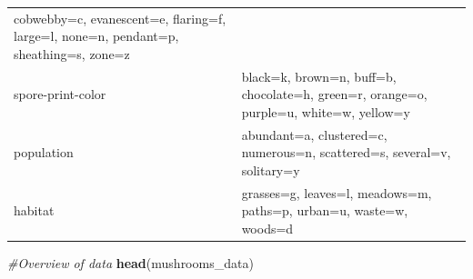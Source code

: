 \documentclass[
]{article}
\newenvironment{Shaded}{\begin{snugshade}}{\end{snugshade}}
\newcommand{\CommentTok}[1]{\textcolor[rgb]{0.56,0.35,0.01}{\textit{#1}}}
\newcommand{\KeywordTok}[1]{\textcolor[rgb]{0.13,0.29,0.53}{\textbf{#1}}}
\newcommand{\NormalTok}[1]{#1}
\begin{document}
\begin{longtable}[]{@{}ll@{}}
\begin{minipage}[t]{0.47\columnwidth}
cobwebby=c, evanescent=e, flaring=f, large=l, none=n, pendant=p,
sheathing=s, zone=z\strut
\end{minipage}\tabularnewline
\begin{minipage}[t]{0.47\columnwidth}\raggedright
spore-print-color\strut
\end{minipage} & \begin{minipage}[t]{0.47\columnwidth}\raggedright
black=k, brown=n, buff=b, chocolate=h, green=r, orange=o, purple=u,
white=w, yellow=y\strut
\end{minipage}\tabularnewline
\begin{minipage}[t]{0.47\columnwidth}\raggedright
population\strut
\end{minipage} & \begin{minipage}[t]{0.47\columnwidth}\raggedright
abundant=a, clustered=c, numerous=n, scattered=s, several=v,
solitary=y\strut
\end{minipage}\tabularnewline
\begin{minipage}[t]{0.47\columnwidth}\raggedright
habitat\strut
\end{minipage} & \begin{minipage}[t]{0.47\columnwidth}\raggedright
grasses=g, leaves=l, meadows=m, paths=p, urban=u, waste=w, woods=d\strut
\end{minipage}\tabularnewline
\bottomrule
\end{longtable}

\begin{Shaded}
\begin{Highlighting}[]
\CommentTok{#Overview of data}
\KeywordTok{head}\NormalTok{(mushrooms_data)}
\end{Highlighting}
\end{Shaded}
\end{document}
